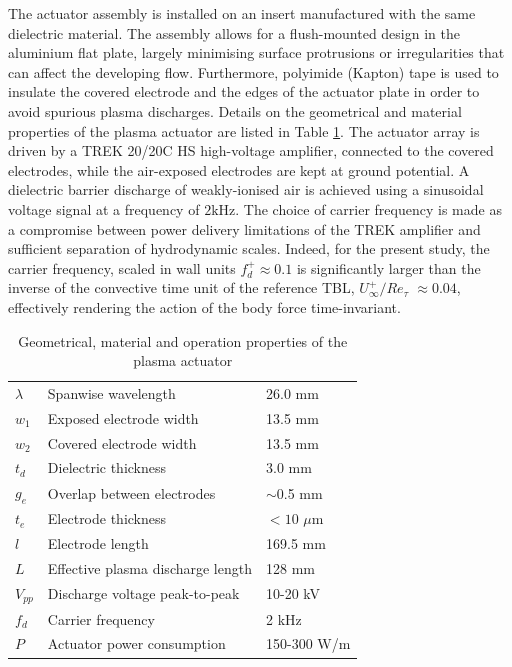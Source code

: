 The actuator assembly is installed on an insert manufactured with the same dielectric material. The assembly allows for a flush-mounted design in the aluminium flat plate, largely minimising surface protrusions or irregularities that can affect the developing flow. Furthermore, polyimide (Kapton) tape is used to insulate the covered electrode and the edges of the actuator plate in order to avoid spurious plasma discharges. Details on the geometrical and material properties of the plasma actuator are listed in Table \ref{tab:actuatorparam}. The actuator array is driven by a TREK 20/20C HS high-voltage amplifier, connected to the covered electrodes, while the air-exposed electrodes are kept at ground potential. A dielectric barrier discharge of weakly-ionised air is achieved using a sinusoidal voltage signal at a frequency of $2\mathrm{kHz}$. The choice of carrier frequency is made as a compromise between power delivery limitations of the TREK amplifier and sufficient separation of hydrodynamic scales. Indeed, for the present study, the carrier frequency, scaled in wall units $f_d^+ \approx 0.1$ is significantly larger than the inverse of the convective time unit of the reference TBL, $U_\infty^+/Re_\tau$ $\approx 0.04$, %
effectively rendering the action of the body force time-invariant.

\begin{table}[t]
\centering
\begin{tabular}{lll}
\toprule
$\lambda$ & Spanwise wavelength & 26.0 mm \\
$w_1$ & Exposed electrode width & 13.5 mm \\
$w_2$ & Covered electrode width & 13.5 mm \\
$t_d$ & Dielectric thickness & 3.0 mm \\
$g_e$ & Overlap between electrodes & $\sim$0.5 mm \\
$t_e$ & Electrode thickness & $<10$ $\mu$m \\
$l$ & Electrode length & 169.5 mm \\
$L$ & Effective plasma discharge length & 128 mm \\
$V_{pp}$ & Discharge voltage peak-to-peak & 10-20 kV \\
$f_d$ & Carrier frequency & 2 kHz \\ 
$P$ & Actuator power consumption & 150-300 W/m\\
\bottomrule
\end{tabular}
\caption{Geometrical, material and operation properties of the plasma actuator}\label{tab:actuatorparam}
\end{table}

